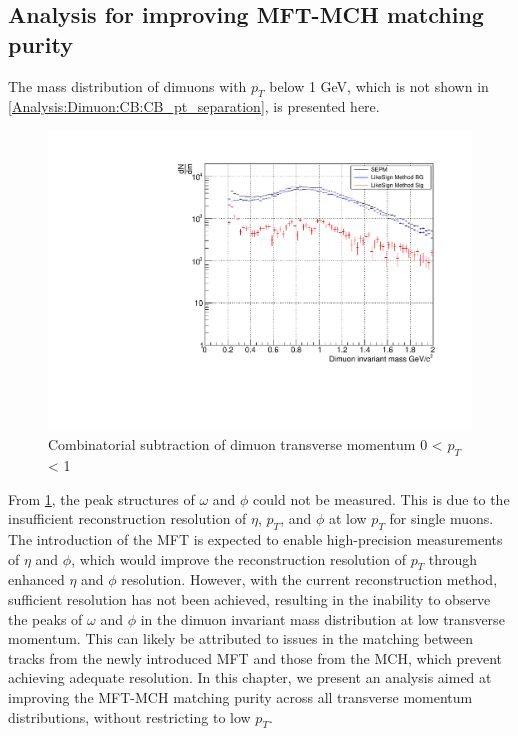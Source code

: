     \subsection{Analysis for improving MFT-MCH matching purity}
    \label{matching improvements}
        The mass distribution of dimuons with \( p_T \) below 1 GeV, which is not shown in \ref{Analysis:Dimuon:CB:CB_pt_separation}, is presented here.
        \begin{figure}
            \centering
            \includegraphics[keepaspectratio, scale=0.4]{fig/3_6_CB_pt0to1.pdf}
            \caption{Combinatorial subtraction of dimuon transverse momentum 0 < $p_T$ < 1}
            \label{Analysis:Dimuon:pt0to1}
        \end{figure}
        From \ref{Analysis:Dimuon:pt0to1}, the peak structures of \(\omega\) and \(\phi\) could not be measured. This is due to the insufficient reconstruction resolution of \(\eta\), \(p_T\), and \(\phi\) at low \(p_T\) for single muons. The introduction of the MFT is expected to enable high-precision measurements of \(\eta\) and \(\phi\), which would improve the reconstruction resolution of \(p_T\) through enhanced \(\eta\) and \(\phi\) resolution. However, with the current reconstruction method, sufficient resolution has not been achieved, resulting in the inability to observe the peaks of \(\omega\) and \(\phi\) in the dimuon invariant mass distribution at low transverse momentum. This can likely be attributed to issues in the matching between tracks from the newly introduced MFT and those from the MCH, which prevent achieving adequate resolution. In this chapter, we present an analysis aimed at improving the MFT-MCH matching purity across all transverse momentum distributions, without restricting to low \(p_T\).

